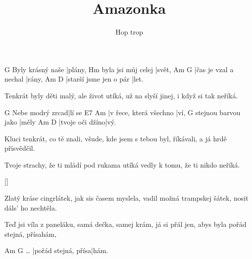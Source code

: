 \documentclass{song}
\title{Amazonka}
\author{Hop trop}
\begin{document}
\strophe
                 G
Byly krásný naše |plány,
                   Hm
byla jsi můj celej |svět,
Am                    G
|čas je vzal a nechal |rány,
Am                     D
|starší jsme jen o pár |let.
\endstrophe

\strophe*
Tenkrát byly děti malý,
ale život utíká,
už na  slyší jinej,
i když si tak neříká.
\endstrophe

                G
Nebe modrý zrcad|lí se
E7                     Am
|v řece, která všechno |ví,
                    G
stejnou barvou jako |měly
Am              D
|tvoje oči džíno|vý.
\endstrophe

\strophe*
Kluci tenkrát, co tě znali,
všude, kde jsem s tebou byl,
 říkávali,
a já hrdě přisvědčil.
\endstrophe

\strophe*
Tvoje strachy, že ti mládí
pod rukama utíká
vedly k tomu, že ti nikdo
 neříká.
\endstrophe

\ref{}

\strophe*
Zlatý kráse cingrlátek,
jak sis časem myslela,
vadil možná trampskej šátek,
nosit dáls' ho nechtěla.
\endstrophe

Teď jsi víla z paneláku,
samá dečka, samej krám,
já si přál jen, abys byla
pořád stejná, přísahám,
\endstrophe

\strophe
         Am                  G
\ldots{} |pořád stejná, přísa|hám.
\endstrophe
\end{document}
